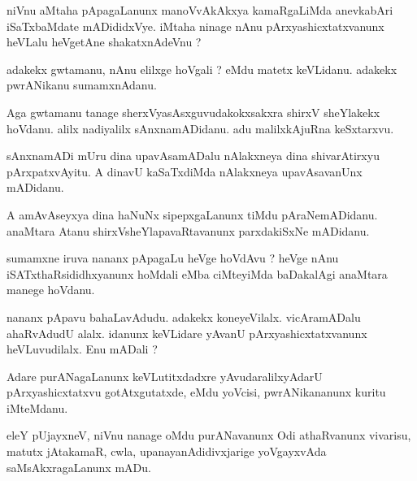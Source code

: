 \documentclass{article}
\begin{document}
\begin{mn}
niVnu  aMtaha  pApagaLanunx  manoVvAkAkxya  kamaRgaLiMda  anevkabAri  iSaTxbaMdate  mADididxVye.  iMtaha  ninage  
nAnu  pArxyashicxtatxvanunx  heVLalu  heVgetAne  shakatxnAdeVnu ?
\end{mn}

\begin{mn}
adakekx  gwtamanu,  nAnu  elilxge  hoVgali ?  eMdu  matetx  keVLidanu.  adakekx  pwrANikanu  sumamxnAdanu.
\end{mn}

\begin{mn}
Aga  gwtamanu  tanage  sherxVyasAsxguvudakokxsakxra  shirxV sheYlakekx  hoVdanu.  alilx  nadiyalilx  sAnxnamADidanu.  
adu  malilxkAjuRna  keSxtarxvu.
\end{mn}

\begin{mn}
sAnxnamADi  mUru dina  upavAsamADalu  nAlakxneya  dina  shivarAtirxyu  pArxpatxvAyitu.  A  dinavU  kaSaTxdiMda  
nAlakxneya  upavAsavanUnx  mADidanu.
\end{mn}

\begin{mn}
A  amAvAseyxya  dina  haNuNx sipepxgaLanunx  tiMdu  pAraNemADidanu.  anaMtara  Atanu  shirxVsheYlapavaRtavanunx  
parxdakiSxNe  mADidanu.
\end{mn}

\begin{mn}
sumamxne  iruva  nananx  pApagaLu  heVge  hoVdAvu ?  heVge  nAnu  iSATxthaRsididhxyanunx  hoMdali  eMba  ciMteyiMda  
baDakalAgi  anaMtara  manege  hoVdanu.
\end{mn}

\begin{mn}
nananx  pApavu  bahaLavAdudu.  adakekx  koneyeVilalx.  vicAramADalu  ahaRvAdudU  alalx.  idanunx  keVLidare  yAvanU 
 pArxyashicxtatxvanunx  heVLuvudilalx.  Enu  mADali ?
\end{mn}

\begin{mn}
Adare  purANagaLanunx  keVLutitxdadxre  yAvudaralilxyAdarU  pArxyashicxtatxvu  gotAtxgutatxde,  eMdu  yoVcisi,  
pwrANikananunx  kuritu  iMteMdanu.
\end{mn}

\begin{mn}
eleY  pUjayxneV,  niVnu  nanage  oMdu  purANavanunx  Odi  athaRvanunx  vivarisu,  matutx  jAtakamaR,  cwla,  
upanayanAdidivxjarige  yoVgayxvAda  saMsAkxragaLanunx  mADu.
\end{mn}
\end{document}
